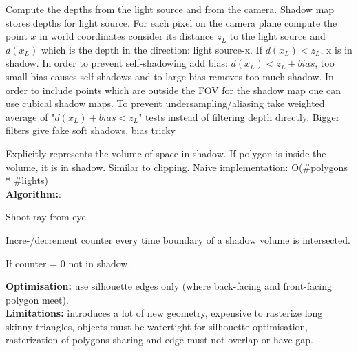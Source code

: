 Compute the depths from the light source and from the camera. Shadow map stores depths for light source. For each pixel on the camera plane compute the point $x$ in world coordinates consider its distance $z_L$ to the light source and $d(x_L)$ which is the depth in the direction: light source-x. If $d(x_L) < z_L$, x is in shadow. In order to prevent self-shadowing add bias: $d(x_L) < z_L + bias$, too small bias causes self shadows and to large bias removes too much shadow. In order to include points which are outside the FOV for the shadow map one can use cubical shadow maps. To prevent undersampling/aliasing take weighted average of "$d(x_L) + bias < z_L$" tests instead of filtering depth directly. Bigger filters give fake soft shadows, bias tricky


 Explicitly represents the volume of space in shadow. If polygon is inside the volume, it is in shadow. Similar to clipping. Naive implementation: O(\#polygons * \#lights)\\
\textbf{Algorithm:}: 
\begin{compactitem}
    \item Shoot ray from eye.
    \item Incre-/decrement counter every time boundary of a shadow volume is intersected.
    \item If counter = 0 not in shadow.
\end{compactitem}
\textbf{Optimisation:} use silhouette edges only (where back-facing and front-facing polygon meet).\\
\textbf{Limitations:} introduces a lot of new geometry, expensive to rasterize long skinny triangles, objects must be watertight for silhouette optimisation, rasterization of polygons sharing and edge must not overlap or have gap.

